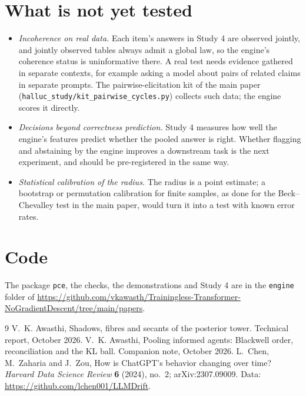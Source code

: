 \documentclass[11pt]{article}
\theoremstyle{definition}\newtheorem{definition}{Definition}
\begin{document}
\section{What is not yet tested}
\begin{itemize}[nosep]
\item \emph{Incoherence on real data.} Each item's answers in Study 4 are observed jointly, and jointly observed tables always admit a
  global law, so the engine's coherence status is uninformative there. A real test needs evidence gathered in separate contexts, for
  example asking a model about pairs of related claims in separate prompts. The pairwise-elicitation kit of the main paper
  (\texttt{halluc\_study/kit\_pairwise\_cycles.py}) collects such data; the engine scores it directly.
\item \emph{Decisions beyond correctness prediction.} Study 4 measures how well the engine's features predict whether the pooled answer
  is right. Whether flagging and abstaining by the engine improves a downstream task is the next experiment, and should be
  pre-registered in the same way.
\item \emph{Statistical calibration of the radius.} The radius is a point estimate; a bootstrap or permutation calibration for finite
  samples, as done for the Beck--Chevalley test in the main paper, would turn it into a test with known error rates.
\end{itemize}

\section*{Code}
The package \texttt{pce}, the checks, the demonstrations and Study 4 are in the \texttt{engine} folder of
\url{https://github.com/vkawasth/Trainingless-Transformer-NoGradientDescent/tree/main/papers}.

\begin{thebibliography}{9}
 V.~K. Awasthi, Shadows, fibres and secants of the posterior tower. Technical report, October 2026.
 V.~K. Awasthi, Pooling informed agents: Blackwell order, reconciliation and the KL ball. Companion note, October 2026.
 L.~Chen, M.~Zaharia and J.~Zou, How is ChatGPT's behavior changing over time? \emph{Harvard Data Science
  Review} \textbf{6} (2024), no.~2; arXiv:2307.09009. Data: \url{https://github.com/lchen001/LLMDrift}.
\end{thebibliography}
\end{document}
